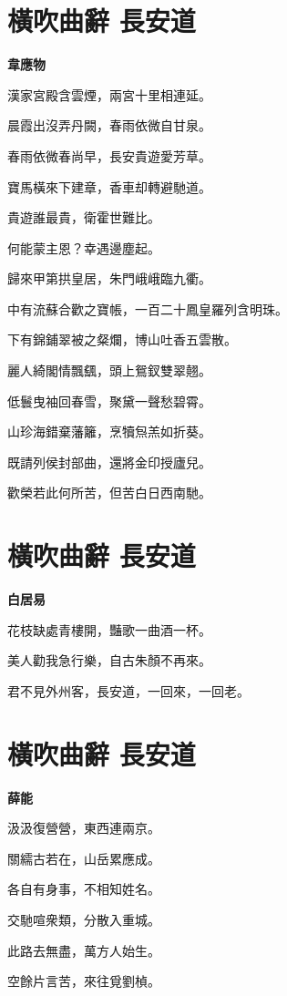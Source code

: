 \documentclass[12pt,a4paper]{ctexbook}
\begin{document}
\section{橫吹曲辭 長安道}
\textbf{韋應物}\par\vspace{0.5em}
漢家宮殿含雲煙，兩宮十里相連延。\par
晨霞出沒弄丹闕，春雨依微自甘泉。\par
春雨依微春尚早，長安貴遊愛芳草。\par
寶馬橫來下建章，香車却轉避馳道。\par
貴遊誰最貴，衛霍世難比。\par
何能蒙主恩？幸遇邊塵起。\par
歸來甲第拱皇居，朱門峨峨臨九衢。\par
中有流蘇合歡之寶帳，一百二十鳳皇羅列含明珠。\par
下有錦鋪翠被之粲爛，博山吐香五雲散。\par
麗人綺閣情飄颻，頭上鴛釵雙翠翹。\par
低鬟曳袖回春雪，聚黛一聲愁碧霄。\par
山珍海錯棄藩籬，烹犢炰羔如折葵。\par
既請列侯封部曲，還將金印授廬兒。\par
歡榮若此何所苦，但苦白日西南馳。\par

\section{橫吹曲辭 長安道}
\textbf{白居易}\par\vspace{0.5em}
花枝缺處青樓開，豔歌一曲酒一杯。\par
美人勸我急行樂，自古朱顏不再來。\par
君不見外州客，長安道，一回來，一回老。\par

\section{橫吹曲辭 長安道}
\textbf{薛能}\par\vspace{0.5em}
汲汲復營營，東西連兩京。\par
關繻古若在，山岳累應成。\par
各自有身事，不相知姓名。\par
交馳喧衆類，分散入重城。\par
此路去無盡，萬方人始生。\par
空餘片言苦，來往覓劉楨。\par
\end{document}
